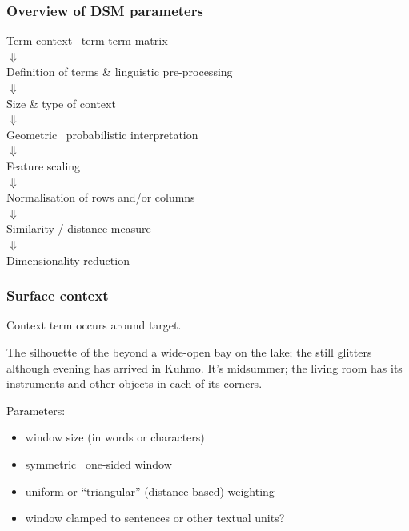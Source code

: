 \begin{frame}
  \frametitle{Overview of DSM parameters}

  \ungap[1]
  \begin{center}
    Term-context \vs\ term-term matrix\\
    $\Downarrow$\\
    Definition of terms \& linguistic pre-processing\\
    $\Downarrow$\\
    \h{Size \& type of context}\\
    $\Downarrow$\\
    Geometric \vs\ probabilistic interpretation\\
    $\Downarrow$\\
    Feature scaling\\
    $\Downarrow$\\
    Normalisation of rows and/or columns\\
    $\Downarrow$\\
    Similarity / distance measure\\
    $\Downarrow$\\
    Dimensionality reduction
  \end{center}
\end{frame}

\begin{frame}
  \frametitle{Surface context}
  
  \begin{center}
    Context term occurs  around target.
  \end{center}

  The {\color{secondary}silhouette of the} 
  {\color{secondary}beyond a wide-open} bay on {\color{secondary}the lake;
    the}  {\color{secondary}still glitters although} evening
  has arrived in Kuhmo. It's midsummer; the living room has its
  instruments and other objects in each of its corners.
  
  \gap
  Parameters:
  \begin{itemize}
  \item window size (in words or characters)
  \item symmetric \vs\ one-sided window
  \item uniform or ``triangular'' (distance-based) weighting
  \item window clamped to sentences or other textual units?
  \end{itemize}
\end{frame}


